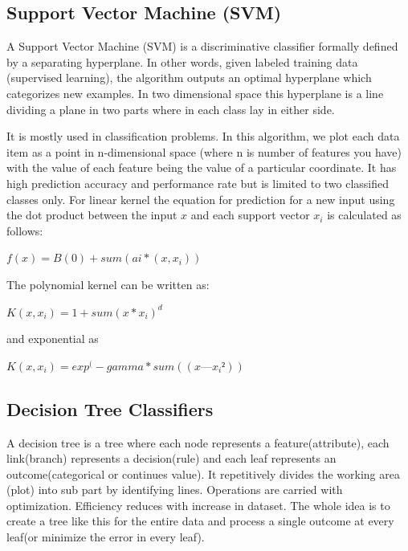 \documentclass[a4paper, 12pt]{article}
\begin{document}
\subsection{Support Vector Machine (SVM)}
\par
\hspace{1cm}
A Support Vector Machine (SVM) is a discriminative classifier formally defined by a separating hyperplane. In other words, given labeled training data (supervised learning), the algorithm outputs an optimal hyperplane which categorizes new examples. In two dimensional space this hyperplane is a line dividing a plane in two parts where in each class lay in either side.
\par
\hspace{0.5cm}It is mostly used in classification problems. In this algorithm, we plot each data item as a point in n-dimensional space (where n is number of features you have) with the value of each feature being the value of a particular coordinate. It has high prediction accuracy and performance rate but is limited to two classified classes only.
For linear kernel the equation for prediction for a new input using the dot product between the input $x$ and each support vector $x_i$ is calculated as follows:
\vspace{0.2cm}
\par
\hfil $f(x) = B(0) + sum(ai * (x, x_i))$
\vspace{0.2cm}
\par
The polynomial kernel can be written as: 
\par
\vspace{0.2cm}
\hfil $K(x,x_i) = 1 + sum(x * x_i)^d$
\vspace{0.2cm}
\par
and exponential as 
\par
\vspace{0.2cm}
\hfil $K(x,x_i) = exp^(-gamma * sum((x — x_i²))$
\\
\subsection{Decision Tree Classifiers}
\par
\hspace{1cm}
A decision tree is a tree where each node represents a feature(attribute), each link(branch) represents a decision(rule) and each leaf represents an outcome(categorical or continues value).
It repetitively divides the working area (plot) into sub part by identifying lines. Operations are carried with optimization. Efficiency reduces with increase in dataset.
The whole idea is to create a tree like this for the entire data and process a single outcome at every leaf(or minimize the error in every leaf).
\\
\end{document}
